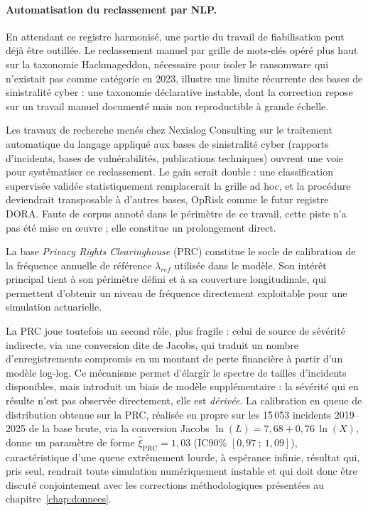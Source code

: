 \paragraph{Automatisation du reclassement par NLP.} En attendant ce registre harmonisé, une
partie du travail de fiabilisation peut déjà être outillée. Le reclassement manuel par grille
de mots-clés opéré plus haut sur la taxonomie Hackmageddon, nécessaire pour isoler le
ransomware qui n'existait pas comme catégorie en 2023, illustre une limite récurrente des
bases de sinistralité cyber : une taxonomie déclarative instable, dont la correction repose
sur un travail manuel documenté mais non reproductible à grande échelle.

Les travaux de recherche menés chez Nexialog Consulting sur le traitement automatique du
langage appliqué aux bases de sinistralité cyber (rapports d'incidents, bases de
vulnérabilités, publications techniques) ouvrent une voie pour systématiser ce reclassement.
Le gain serait double : une classification supervisée validée statistiquement remplacerait la
grille ad hoc, et la procédure deviendrait transposable à d'autres bases, OpRisk comme le
futur registre DORA. Faute de corpus annoté dans le périmètre de ce travail, cette piste n'a
pas été mise en \oe uvre ; elle constitue un prolongement direct.



La base \emph{Privacy Rights Clearinghouse} (PRC) constitue le socle de
calibration de la fréquence annuelle de référence $\lambda_{ref}$ utilisée
dans le modèle. Son intérêt principal tient à son périmètre défini et à sa
couverture longitudinale, qui permettent d'obtenir un niveau de fréquence
directement exploitable pour une simulation actuarielle.

La PRC joue toutefois un second rôle, plus fragile : celui de source de
sévérité indirecte, via une conversion dite de Jacobs, qui traduit un nombre
d'enregistrements compromis en un montant de perte financière à partir d'un
modèle log-log. Ce mécanisme permet d'élargir le spectre de tailles
d'incidents disponibles, mais introduit un biais de modèle supplémentaire :
la sévérité qui en résulte n'est pas observée directement, elle est
\emph{dérivée}. La calibration en queue de distribution obtenue sur la PRC,
réalisée en propre sur les 15\,053 incidents 2019--2025 de la base brute,
via la conversion Jacobs $\ln(L) = 7{,}68 + 0{,}76\,\ln(X)$, donne un
paramètre de forme $\hat{\xi}_{\text{PRC}} = 1{,}03$ (IC90\%
$[0{,}97~;~1{,}09]$), caractéristique d'une queue extrêmement lourde, à
espérance infinie, résultat qui, pris seul, rendrait toute simulation
numériquement instable et qui doit donc être discuté conjointement avec les
corrections méthodologiques présentées au chapitre~\ref{chap:donnees}.

